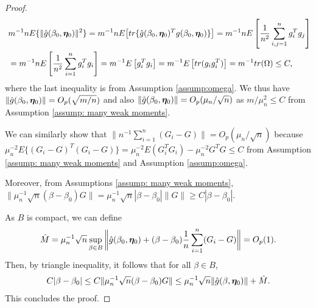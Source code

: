 \documentclass[12pt]{article}
\begin{document}
{\begin{proof}
\begin{align*}
&m^{-1} n E\{\|\hat g (\beta_0, \bm \eta_0) \|^2\} = m^{-1} n E\big[ tr\{ \hat g (\beta_0, \bm \eta_0)^T  g (\beta_0, \bm \eta_0)\}\big] = m^{-1} n E\left[ \frac{1}{n^2}\sum_{i, j=1}^n g_i^T g_j  \right] \\\
&= m^{-1} n E\left[ \frac{1}{n^2}\sum_{i=1}^n g_i^T g_i \right] =m^{-1}  E\left[  g_i^T g_i \right]    = m^{-1}  E\left[ tr( g_i g_i^T) \right]   = m^{-1} tr( \Omega) \leq C,
\end{align*}
where the last inequality is from Assumption \ref{assump:omega}. We thus have $ \|\hat g (\beta_0, \bm \eta_0)\|= O_p(\sqrt{m/n})$ and also $\|\hat g (\beta_0, \bm \eta_0)\|= O_p(\mu_n/\sqrt{n})$ as $m/\mu_n^2\leq C$ from Assumption \ref{assump: many weak moments}. 

We can similarly show that $ \| n^{-1} \sum_{i=1}^n (G_i-G)\|=O_p(\mu_n/\sqrt{n})$ because $ \mu_n^{-2} E\{(G_i-G)^T (G_i-G)\} = \mu_n^{-2} E(G_i^TG_i) - \mu_n^{-2}  G^T G \leq C$ from Assumption \ref{assump: many weak moments} and Assumption \ref{assump:omega}. 

Moreover, from Assumptions \ref{assump: many weak moments}, $\|\mu_n^{-1} \sqrt{n} (\beta-\beta_0) G\|=\mu_n^{-1} \sqrt{n} |\beta-\beta_0| \|G\| \geq C |\beta-\beta_0| $. 

As $B$ is compact, we can define 
\begin{align}
    \hat M=  \mu_n^{-1} \sqrt{n} \sup_{\beta\in B} \bigg\|\hat g(\beta_0, \bm \eta_0) + (\beta- \beta_0) \frac{1}{n} \sum_{i=1}^n (G_i-G) \bigg\| = O_p(1).
\end{align}
Then, by triangle inequality, it follows that for all $\beta\in B$,
\begin{align*}
  C  |\beta-\beta_0| \leq C\|\mu_n^{-1} \sqrt{n} (\beta-\beta_0) G\|\leq \mu_n^{-1}\sqrt{n} \| \hat g(\beta, \bm \eta_0) \|+\hat M.
\end{align*}
This concludes the proof. 
\end{proof}



}
\end{document}
